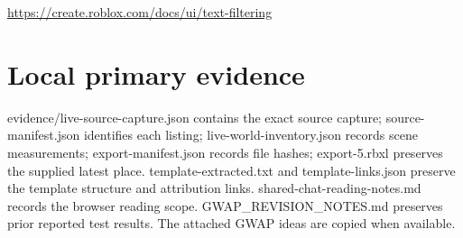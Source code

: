 \url{https://create.roblox.com/docs/ui/text-filtering}

\section{Local primary evidence}
evidence/\allowbreak{}live-source-capture.\allowbreak{}json contains the exact source capture; source-manifest.\allowbreak{}json identifies each listing; live-world-inventory.\allowbreak{}json records scene measurements; export-manifest.\allowbreak{}json records file hashes; export-5.\allowbreak{}rbxl preserves the supplied latest place.\allowbreak{} template-extracted.\allowbreak{}txt and template-links.\allowbreak{}json preserve the template structure and attribution links.\allowbreak{} shared-chat-reading-notes.\allowbreak{}md records the browser reading scope.\allowbreak{} GWAP\_\allowbreak{}REVISION\_\allowbreak{}NOTES.\allowbreak{}md preserves prior reported test results.\allowbreak{} The attached GWAP ideas are copied when available.\allowbreak{}

